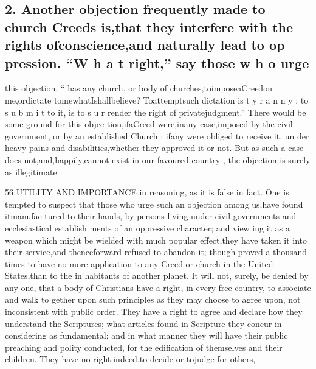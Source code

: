 \documentclass[
]{book}
\begin{document}
\hypertarget{another-objection-frequently-made-to-church-creeds-isthat-they-interfere-with-the-rights-ofconscienceand-naturally-lead-to-op-pression.-w-h-a-t-right-say-those-w-h-o-urge}{%
\subsection{2. Another objection frequently made to church Creeds is,that they interfere with the rights ofconscience,and naturally lead to op pression. ``W h a t right,'' say those w h o urge}\label{another-objection-frequently-made-to-church-creeds-isthat-they-interfere-with-the-rights-ofconscienceand-naturally-lead-to-op-pression.-w-h-a-t-right-say-those-w-h-o-urge}}

this objection, `` has any church, or body of churches,toimposeaCreedon me,ordictate tomewhatIshallbelieve? Toattemptsuch dictation is t y r a n n y ; to s u b m i t to it, is to s u r render the right of privatejudgment.''
There would be some ground for this objec tion,ifaCreed were,inany case,imposed by the civil government, or by an established Church ; ifany were obliged to receive it, un
der heavy pains and disabilities,whether they approved it or not. But as such a case does
not,and,happily,cannot exist in our favoured country , the objection is surely as illegitimate

56 UTILITY AND IMPORTANCE
in reasoning, as it is false in fact. One is
tempted to suspect that those who urge such an objection among us,have found itmanufac tured to their hands, by persons living under civil governments and ecclesiastical establish ments of an oppressive character; and view ing it as a weapon which might be wielded with much popular effect,they have taken it into their service,and thenceforward refused to abandon it; though proved a thousand times to have no more application to any Creed or
church in the United States,than to the in habitants of another planet.
It will not, surely, be denied by any one,
that a body of Christians have a right, in every free country, to associate and walk to
gether upon such principles as they may choose to agree upon, not inconsistent with public order. They have a right to agree and declare how they understand the Scriptures; what articles found in Scripture they concur in considering as fundamental; and in what manner they will have their public preaching and polity conducted, for the edification of themselves and their children. They have no
right,indeed,to decide or tojudge for others,
\end{document}
